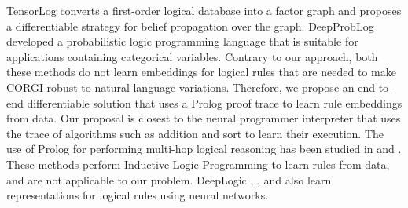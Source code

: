 TensorLog \citep{cohen2016tensorlog} converts a first-order logical database into a factor graph and proposes a differentiable strategy for belief propagation over the graph. DeepProbLog \cite{manhaeve2018deepproblog} developed a probabilistic logic programming language 
that is suitable for applications containing categorical variables. %
Contrary to our approach, both these methods do not learn embeddings for logical rules that are needed
to make CORGI robust to natural language variations. 
Therefore, we propose an end-to-end differentiable solution that uses a Prolog \cite{colmerauer1990introduction} proof trace to learn rule embeddings from data. Our proposal is closest to the neural programmer interpreter \citep{reed2015neural} that uses the trace of algorithms such as addition and sort to learn their execution. 
The use of Prolog for performing multi-hop logical reasoning has been studied in \citet{rocktaschel2017end} and \citet{weber2019nlprolog}.
These methods perform Inductive Logic Programming to learn rules from data, and are not applicable to our problem. 
DeepLogic \cite{cingillioglu2018deeplogic}, \citet{rocktaschel2014low}, and  \citet{wang2016blearning} also learn representations for logical rules using neural networks. 
